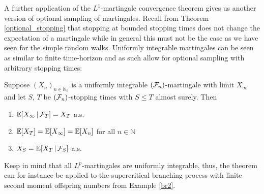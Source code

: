 A further application of the $L^1$-martingale convergence theorem gives us another version of optional sampling of martingales. Recall from Theorem \ref{optional_stopping} that stopping at bounded stopping times does not change the expectation of a martingale while in general this must not be the case as we have seen for the simple random walks. Uniformly integrable martingales can be seen as similar to finite time-horizon and as such allow for optional sampling with arbitrary stopping times:
\begin{llemma}
\begin{theorem}\label{optimal_smapling_ui}
	Suppose $(X_n)_{n\in\mathbb{N}_0}$ is a uniformly integrable $(\mathcal{F}_n)$-martingale with limit $X_{\infty}$ and let $S$, $T$ be $(\mathcal{F}_n)$-stopping times with $S\leq T$ almost surely. Then
	\begin{enumerate}[label=(\roman*)]
		\item
			$\mathbb{E}[X_{\infty}\,|\,\mathcal{F}_T]=X_T$ a.s.
		\item
			$\mathbb{E}[X_T] = \mathbb{E}[X_{\infty}] = \mathbb{E}[X_n]$ for all $n \in \mathbb{N}$
		\item
			$X_S = \mathbb{E}[X_T\,|\,\mathcal{F}_S]$ a.s.
	\end{enumerate}
\end{theorem}
\end{llemma}
Keep in mind that all $L^p$-martingales are uniformly integrable, thus, the theorem can for instance be applied to the supercritical branching process with finite second moment offspring numbers from Example \ref{br2}.
